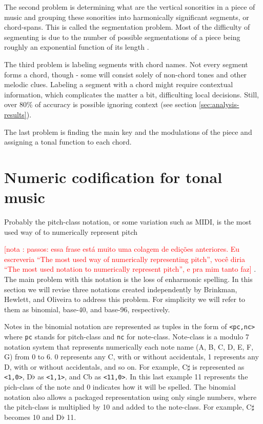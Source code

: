 \documentclass{article}
\newcounter{notacounter}
\newcommand{\nota}[1]{
  \addtocounter{notacounter}{1}
  \textcolor{red}{[nota \arabic{notacounter}: #1]}
}
\begin{document}
The second problem is determining what are the vertical sonorities in
a piece of music and grouping these sonorities into harmonically
significant segments, or chord-spans. This is called the segmentation
problem. Most of the difficulty of segmenting is due to the number of
possible segmentations of a piece being roughly an exponential
function of its length \cite{pardo.ea:algorithms}.

The third problem is labeling segments with chord names. Not every
segment forms a chord, though - some will consist solely of non-chord
tones and other melodic clues. Labeling a segment with a chord might
require contextual information, which complicates the matter a bit,
difficulting local decisions. Still, over 80\% of accuracy is possible
ignoring context (see section \ref{sec:analysis-results}).

The last problem is finding the main key and the modulations of the
piece and assigning a tonal function to each chord.

\section{Numeric codification for tonal music}
\label{sec:codificacao-jamary}

Probably the pitch-class notation, or some variation such as MIDI, is
the most used way of to numerically represent pitch \nota{ passos:
  essa frase está muito uma colagem de edições anteriores. Eu
  escreveria ``The most used way of numerically representing pitch'',
  você diria ``The most used notation to numerically represent
  pitch'', e pra mim tanto faz}. The main problem
with this notation is the loss of enharmonic spelling. In this section
we will revise three notations created independently by Brinkman,
Hewlett, and Oliveira \cite{brinkman:binomial,
  hewlett:base-40, oliveira:busca} to address this problem.
For simplicity we will refer to them as binomial, base-40, and
base-96, respectively.

Notes in the binomial notation are represented as tuples in the form
of \texttt{<pc,nc>} where \texttt{pc} stands for pitch-class and
\texttt{nc} for note-class. Note-class is a modulo 7 notation system
that represents numerically each note name (A, B, C, D, E, F, G) from
0 to 6. 0 represents any C, with or without accidentals, 1 represents
any D, with or without accidentals, and so on. For example, C$\sharp$
is represented as \texttt{<1,0>}, D$\flat$ as \texttt{<1,1>}, and Cb
as \texttt{<11,0>}. In this last example 11 represents the pich-class of the
note and 0 indicates how it will be spelled. The binomial notation
also allows a packaged representation using only single numbers, where
the pitch-class is multiplied by 10 and added to the note-class. For
example, C$\sharp$ becomes 10 and D$\flat$ 11.
\end{document}
